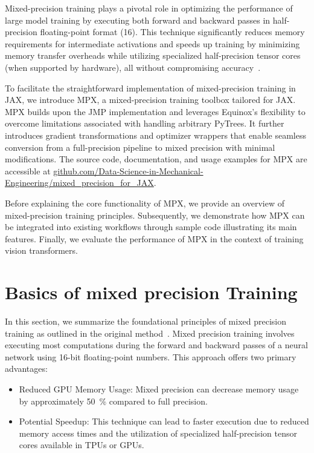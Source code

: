 \documentclass[logo]{dsme}
\newcommand{\mpx}{\textsc{MPX}}
\begin{document}
Mixed-precision training plays a pivotal role in optimizing the performance of large model training by executing both forward and backward passes in half-precision floating-point format (\qty{16}{\bit}). 
This technique significantly reduces memory requirements for intermediate activations and speeds up training by minimizing memory transfer overheads while utilizing specialized half-precision tensor cores (when supported by hardware), all without compromising accuracy~\citep{mixed_precision_paper}.

To facilitate the straightforward implementation of mixed-precision training in JAX, we introduce \mpx{}, a mixed-precision training toolbox tailored for JAX. 
\mpx{} builds upon the JMP implementation and leverages Equinox's flexibility to overcome limitations associated with handling arbitrary PyTrees. 
It further introduces gradient transformations and optimizer wrappers that enable seamless conversion from a full-precision pipeline to mixed precision with minimal modifications. The source code, documentation, and usage examples for \mpx{} are accessible at \url{github.com/Data-Science-in-Mechanical-Engineering/mixed_precision_for_JAX}.

Before explaining the core functionality of \mpx{}, we provide an overview of mixed-precision training principles. 
Subsequently, we demonstrate how \mpx{} can be integrated into existing workflows through sample code illustrating its main features.
Finally, we evaluate the performance of \mpx{} in the context of training vision transformers.

\section{Basics of mixed precision Training}
In this section, we summarize the foundational principles of mixed precision training as outlined in the original method~\citep{mixed_precision_paper}. 
Mixed precision training involves executing most computations during the forward and backward passes of a neural network using 16-bit floating-point numbers. 
This approach offers two primary advantages: 
\begin{itemize} 
    \item Reduced GPU Memory Usage: Mixed precision can decrease memory usage by approximately \SI{50}{\percent} compared to full precision. 
    \item Potential Speedup: This technique can lead to faster execution due to reduced memory access times and the utilization of specialized half-precision tensor cores available in TPUs or GPUs. 
\end{itemize}
\end{document}
